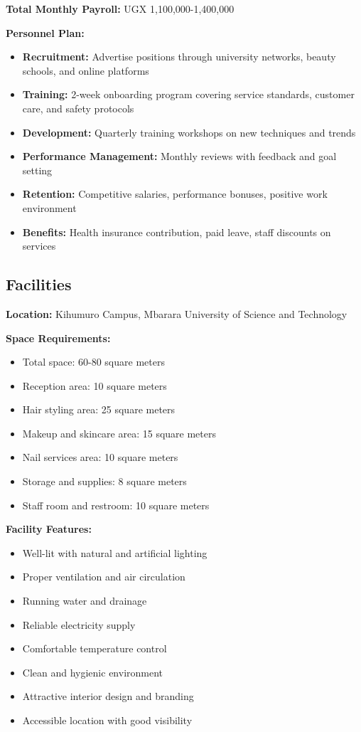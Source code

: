 \textbf{Total Monthly Payroll:} UGX 1,100,000-1,400,000

\textbf{Personnel Plan:}
\begin{itemize}[leftmargin=2em]
    \item \textbf{Recruitment:} Advertise positions through university networks, beauty schools, and online platforms
    \item \textbf{Training:} 2-week onboarding program covering service standards, customer care, and safety protocols
    \item \textbf{Development:} Quarterly training workshops on new techniques and trends
    \item \textbf{Performance Management:} Monthly reviews with feedback and goal setting
    \item \textbf{Retention:} Competitive salaries, performance bonuses, positive work environment
    \item \textbf{Benefits:} Health insurance contribution, paid leave, staff discounts on services
\end{itemize}

\subsection{Facilities}

\textbf{Location:} Kihumuro Campus, Mbarara University of Science and Technology

\textbf{Space Requirements:}
\begin{itemize}[leftmargin=2em]
    \item Total space: 60-80 square meters
    \item Reception area: 10 square meters
    \item Hair styling area: 25 square meters
    \item Makeup and skincare area: 15 square meters
    \item Nail services area: 10 square meters
    \item Storage and supplies: 8 square meters
    \item Staff room and restroom: 10 square meters
\end{itemize}

\textbf{Facility Features:}
\begin{itemize}[leftmargin=2em]
    \item Well-lit with natural and artificial lighting
    \item Proper ventilation and air circulation
    \item Running water and drainage
    \item Reliable electricity supply
    \item Comfortable temperature control
    \item Clean and hygienic environment
    \item Attractive interior design and branding
    \item Accessible location with good visibility
\end{itemize}

